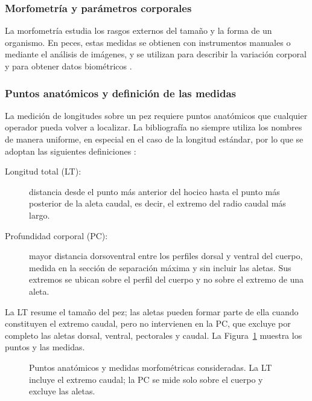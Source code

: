 \subsubsection{Morfometría y parámetros corporales}

La morfometría estudia los rasgos externos del tamaño y la forma de un organismo. En peces, estas medidas se obtienen con instrumentos manuales o mediante el análisis de imágenes, y se utilizan para describir la variación corporal y para obtener datos biométricos \parencite{Petrtyl2014}.

\subsubsection{Puntos anatómicos y definición de las medidas}
\label{sec:puntos-def}

La medición de longitudes sobre un pez requiere puntos anatómicos que cualquier operador pueda volver a localizar. La bibliografía no siempre utiliza los nombres de manera uniforme, en especial en el caso de la longitud estándar, por lo que se adoptan las siguientes definiciones \parencite{Howe2002,Saleh2023,Steeds2024}:

\begin{description}
  \item[Longitud total (LT):] distancia desde el punto más anterior del hocico hasta el punto más posterior de la aleta caudal, es decir, el extremo del radio caudal más largo.
  \item[Profundidad corporal (PC):] mayor distancia dorsoventral entre los perfiles dorsal y ventral del cuerpo, medida en la sección de separación máxima y sin incluir las aletas. Sus extremos se ubican sobre el perfil del cuerpo y no sobre el extremo de una aleta.
\end{description}

La LT resume el tamaño del pez; las aletas pueden formar parte de ella cuando constituyen el extremo caudal, pero no intervienen en la PC, que excluye por completo las aletas dorsal, ventral, pectorales y caudal. La Figura~\ref{fig:2-2} muestra los puntos y las medidas.

\begin{figure}[H]
\centering
\caption[Puntos anatómicos y medidas morfométricas consideradas]{Puntos anatómicos y medidas morfométricas consideradas. La LT incluye el extremo caudal; la PC se mide solo sobre el cuerpo y excluye las aletas.}
\label{fig:2-2}

\end{figure}

